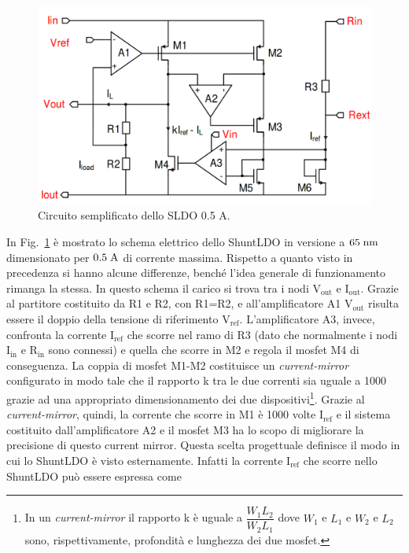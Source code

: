 \begin{figure}[!htbp]
\centering
\includegraphics[scale=.3]{Immagini/SLDO5A}
\caption{Circuito semplificato dello SLDO 0.5 A.}
\label{SLDO5A}
\end{figure}
In Fig.~\ref{SLDO5A} \`e mostrato lo schema elettrico dello ShuntLDO in versione a $65\rm \; nm$ dimensionato per $0.5\rm \; A$ di corrente massima.
Rispetto a quanto visto in precedenza si hanno alcune differenze, benché l'idea generale di funzionamento rimanga la stessa. 
In questo schema il carico si trova tra i nodi $\mathrm{V_{out}}$ e $\mathrm{I_{out}}$. Grazie al partitore costituito da R1 e R2, con R1=R2, e all'amplificatore A1 $\mathrm{V_{out}}$ risulta essere il doppio della tensione di riferimento $\mathrm{V_{ref}}$.
L'amplificatore A3, invece, confronta la corrente $\mathrm{I_{ref}}$ che scorre nel ramo di R3 (dato che normalmente i nodi $\mathrm{I_{in}}$ e $\mathrm{R_{in}}$ sono connessi) e quella che scorre in M2 e regola il mosfet M4 di conseguenza. 
La coppia di mosfet M1-M2 costituisce un \textit{current-mirror} configurato in modo tale che il rapporto k tra le due correnti sia uguale a 1000 grazie ad una appropriato dimensionamento dei due dispositivi\footnote{
  In un \textit{current-mirror} il rapporto k è uguale a $\dfrac{W_1L_2}{W_2L_1}$ dove $W_1$ e $L_1$ e $W_2$ e $L_2$ sono, rispettivamente, profondità e lunghezza dei due mosfet.
}. 
Grazie al \textit{current-mirror}, quindi, la corrente che scorre in M1 è 1000 volte $\mathrm{I_{ref}}$ e il sistema costituito dall'amplificatore A2 e il mosfet M3 ha lo scopo di migliorare la precisione di questo current mirror.
Questa scelta progettuale definisce il modo in cui lo ShuntLDO è visto esternamente. Infatti la corrente $\mathrm{I_{ref}}$ che scorre nello ShuntLDO pu\`o essere espressa come
